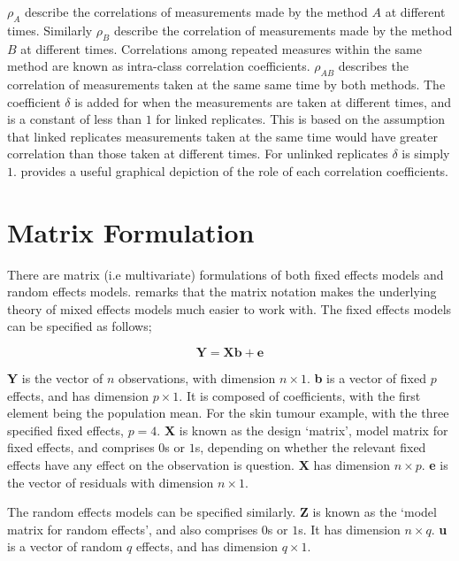 \documentclass[12pt, a4paper]{report}
\theoremstyle{plain}
\theoremstyle{definition}
\theoremstyle{remark}
\begin{document}
	$\rho_{A}$ describe the correlations of measurements made by the method $A$ at different times. Similarly $\rho_{B}$ describe the correlation of measurements made by the method $B$ at different times. Correlations among repeated measures within the same method are known as intra-class correlation coefficients. $\rho_{AB}$ describes the correlation of measurements taken at the same same time by both methods. The coefficient $\delta$ is added for when the measurements are taken at different times, and is a constant of less than $1$ for linked replicates. This is based on the assumption that linked replicates measurements taken at the same time would have greater correlation than those taken at different times. For unlinked replicates $\delta$ is simply $1$. \citet{hamlett} provides a useful graphical depiction of the role of each correlation coefficients.
	
	
	
	
	
	
	








\section{Matrix Formulation} There are matrix (i.e multivariate)
formulations of both fixed effects models and random effects
models. \citet{BrownPrescott} remarks that the matrix notation
makes the underlying theory of mixed effects models much easier to
work with. The fixed effects models can be specified as follows;

\begin{equation}
\textbf{Y} = \textbf{Xb} + \textbf{e}
\end{equation}

\textbf{Y} is the vector of $n$ observations, with dimension $n
\times 1$. \textbf{b} is a vector of fixed $p$ effects, and has
dimension $p \times 1$. It is composed of coefficients, with the
first element being the population mean. For the skin tumour
example, with the three specified fixed effects, $p=4$. \textbf{X}
is known as the design `matrix', model matrix for fixed effects,
and comprises $0$s or $1$s, depending on whether the relevant
fixed effects have any effect on the observation is question.
\textbf{X} has dimension $n \times p$. \textbf{e} is the vector of
residuals with dimension $n \times 1$.

The random effects models can be specified similarly. \textbf{Z}
is known as the `model matrix for random effects', and also
comprises $0$s or $1$s. It has dimension $n \times q$. \textbf{u}
is a vector of random $q$ effects, and has dimension $q \times 1$.
\end{document}
